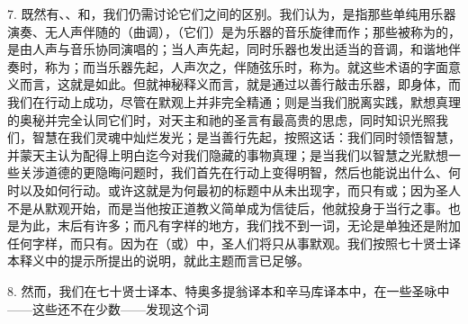 7. 既然有、、和，我们仍需讨论它们之间的区别。我们认为，是指那些单纯用乐器演奏、无人声伴随的（曲调），（它们）是为乐器的音乐旋律而作；那些被称为的，是由人声与音乐协同演唱的；当人声先起，同时乐器也发出适当的音调，和谐地伴奏时，称为；而当乐器先起，人声次之，伴随弦乐时，称为。就这些术语的字面意义而言，这就是如此。但就神秘释义而言，就是通过以善行敲击乐器，即身体，而我们在行动上成功，尽管在默观上并非完全精通；则是当我们脱离实践，默想真理的奥秘并完全认同它们时，对天主和祂的圣言有最高贵的思虑，同时知识光照我们，智慧在我们灵魂中灿烂发光；是当善行先起，按照这话：我们同时领悟智慧，并蒙天主认为配得上明白迄今对我们隐藏的事物真理；是当我们以智慧之光默想一些关涉道德的更隐晦问题时，我们首先在行动上变得明智，然后也能说出什么、何时以及如何行动。或许这就是为何最初的标题中从未出现字，而只有或；因为圣人不是从默观开始，而是当他按正道教义简单成为信徒后，他就投身于当行之事。也是为此，末后有许多；而凡有字样的地方，我们找不到一词，无论是单独还是附加任何字样，而只有。因为在（或）中，圣人们将只从事默观。我们按照七十贤士译本释义中的提示所提出的说明，就此主题而言已足够。\par

8. 然而，我们在七十贤士译本、特奥多提翁译本和辛马库译本中，在一些圣咏中——这些还不在少数——发现这个词\par

